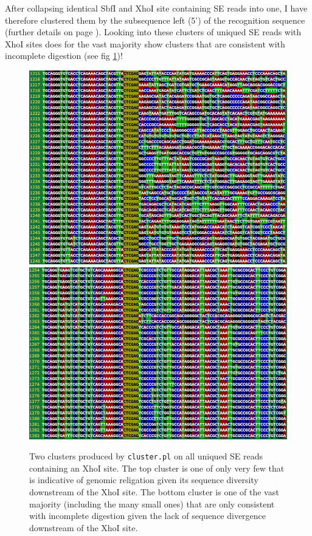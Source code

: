 \documentclass[a4paper,12pt,times,print,index,custombib,custommargin]{PhDThesisPSnPDF}\usepackage[]{graphicx}\usepackage[]{color}
\begin{document}
After collapsing identical SbfI and XhoI site containing SE reads into one, I have therefore clustered them by the subsequence left (5') of the recognition sequence (further details on page \pageref{cluster_analysis}).
Looking into these clusters of uniqued SE reads with XhoI sites does for the vast majority show clusters that are consistent with incomplete digestion (see fig \ref{all_ind_XhoI_in_SE_cl_by_pos})!
%
\begin{figure}
\centering
\includegraphics[width=.9\textwidth]{all_ind_XhoI_in_SE_cl_by_pos_1}\\
\vspace{10pt}
\includegraphics[width=.9\textwidth]{all_ind_XhoI_in_SE_cl_by_pos_2}
\caption{Two clusters produced by \texttt{cluster.pl} on all uniqued SE reads containing an XhoI site. The top cluster is one of only very few that is indicative of genomic religation given its sequence diversity downstream of the XhoI site. The bottom cluster is one of the vast majority (including the many small ones) that are only consistent with incomplete digestion given the lack  of sequence divergence downstream of the XhoI site.}
\label{all_ind_XhoI_in_SE_cl_by_pos}
\end{figure}
\end{document}

